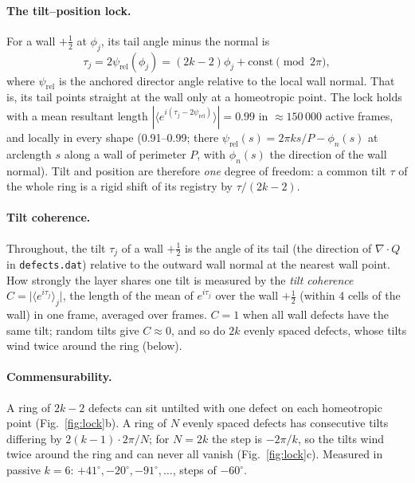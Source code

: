 \documentclass[11pt,a4paper]{article}
\newcommand{\half}{\tfrac12}
\begin{document}
\paragraph{The tilt--position lock.} For a wall $+\half$ at $\phi_j$, its tail angle minus the normal is
\begin{equation}
  \tau_j = 2\psi_\mathrm{rel}(\phi_j) = (2k-2)\phi_j+\text{const}\pmod{2\pi},
\end{equation}
where $\psi_\mathrm{rel}$ is the anchored director angle relative to the local wall normal. That is, its tail points straight at the wall only at a homeotropic point.
The lock holds with a mean resultant length $|\langle e^{i(\tau_j-2\psi_\mathrm{rel})}\rangle|=0.99$ in $\approx150\,000$ active frames, and locally in every shape (0.91--0.99;
there $\psi_\mathrm{rel}(s)=2\pi k s/P-\phi_n(s)$ at arclength $s$ along a wall of perimeter $P$, with $\phi_n(s)$ the direction of the wall normal). Tilt and position are therefore \emph{one} degree of freedom: a common tilt $\tau$ of the whole
ring is a rigid shift of its registry by $\tau/(2k-2)$.

\paragraph{Tilt coherence.} Throughout, the tilt $\tau_j$ of a wall $+\half$ is the angle of its tail (the direction of $\nabla\!\cdot Q$ in \texttt{defects.dat}) relative to the outward
wall normal at the nearest wall point. How strongly the layer shares one tilt is measured by the \emph{tilt coherence} $C=\big|\langle e^{i\tau_j}\rangle_j\big|$, the length of the mean
of $e^{i\tau_j}$ over the wall $+\half$ (within 4 cells of the wall) in one frame, averaged over frames. $C=1$ when all wall defects have the same tilt; random tilts give
$C\approx0$, and so do $2k$ evenly spaced defects, whose tilts wind twice around the ring (below).

\paragraph{Commensurability.} A ring of $2k-2$ defects can sit untilted with one defect on each homeotropic point (Fig.~\ref{fig:lock}b). A ring of $N$ evenly spaced
defects has consecutive tilts differing by $2(k-1)\cdot2\pi/N$; for $N=2k$ the step is $-2\pi/k$, so the tilts wind twice around the ring and can never all vanish
(Fig.~\ref{fig:lock}c). Measured in passive $k=6$: $+41^\circ,-20^\circ,-91^\circ,\dots$, steps of $-60^\circ$.
\end{document}
